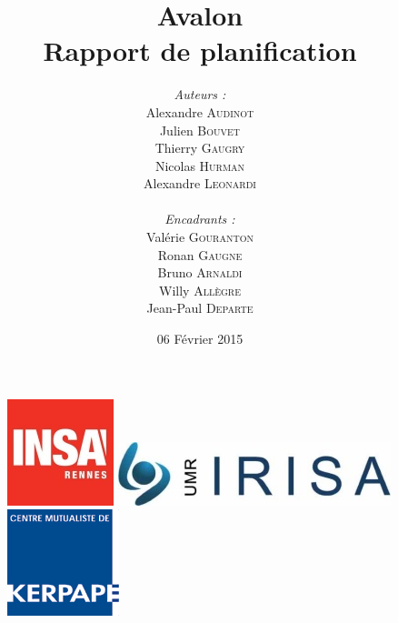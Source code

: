 \documentclass[a4paper,11pt]{article}
\title{
  \textbf{Avalon}\\
  Rapport de planification
}
\author{
\begin{minipage}{0.4\textwidth}
	\begin{flushleft} \large
		\emph{Auteurs :}\\
		Alexandre \textsc{Audinot}\\
		Julien \textsc{Bouvet}\\
		Thierry \textsc{Gaugry}\\
		Nicolas \textsc{Hurman}\\
		Alexandre \textsc{Leonardi}\\
	\end{flushleft}
\end{minipage}
\begin{minipage}{0.4\textwidth}
	\begin{flushright} \large
		\emph{Encadrants :} \\
		Valérie \textsc{Gouranton}\\
		Ronan \textsc{Gaugne}\\
		Bruno \textsc{Arnaldi}\\
		Willy \textsc{Allègre}\\
		Jean-Paul  \textsc{Departe}\\
	\end{flushright}
\end{minipage}
}
\date{06 Février 2015}
\begin{document}
\maketitle
\thispagestyle{empty}

\begin{figure}[h!]
   \begin{minipage}{0.3\linewidth}
      \includegraphics[scale=0.9]{3-Planification/img/logo_insa.jpeg}
   \end{minipage} 
   \begin{minipage}{0.2\linewidth}
      \centering
      \includegraphics[scale=0.5,left]{3-Planification/img/logo_irisa.jpg}
   \end{minipage}\hfill
   \begin{minipage}{0.2\linewidth}
      \includegraphics[scale=0.9]{3-Planification/img/logo_kerpape.png}
   \end{minipage}
\end{figure}

\newpage
\tableofcontents
\pagebreak


\pagebreak

\pagebreak

\pagebreak

\pagebreak

\end{document}

